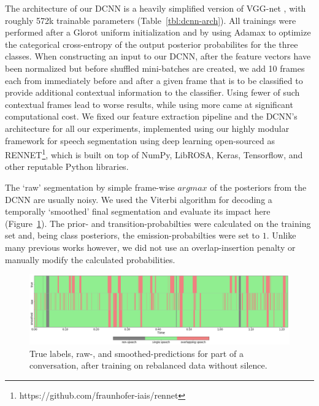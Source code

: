 \documentclass[a4paper]{article}
\begin{document}
The architecture of our DCNN is a heavily simplified version of VGG-net \cite{simonyan_very_2014},
with roughly 572k trainable parameters (Table~\ref{tbl:dcnn-arch}).
All trainings were performed after a Glorot uniform initialization and by using Adamax to optimize the categorical cross-entropy of the output posterior probabilites for the three classes.
When constructing an input to our DCNN,
after the feature vectors have been normalized but before shuffled mini-batches are created,
we add 10 frames each from immediately before and after a given frame that is to be classified
to provide additional contextual information to the classifier.
Using fewer of such contextual frames lead to worse results,
while using more came at significant computational cost.
We fixed our feature extraction pipeline and the DCNN's architecture for all our experiments,
implemented using our highly modular framework for
speech segmentation using deep learning open-sourced as
{RENNET}\footnote{https://github.com/fraunhofer-iais/rennet},
which is built on top of NumPy, LibROSA, Keras, Tensorflow, and other reputable Python libraries.

The `raw' segmentation by simple frame-wise $argmax$ of the posteriors from the DCNN are usually noisy.
We used the Viterbi algorithm \cite{rabiner_tutorial_1989} for decoding a temporally `smoothed' final segmentation and evaluate its impact here (Figure~\ref{fig:raw-smth-preds}).
The prior- and transition-probabilties were calculated on the training set and,
being class posteriors, the emission-probabilties were set to $1$.
Unlike many previous works \cite{zelenak_simultaneous_2012,zelenak_speaker_2012,GeigerUsinglinguisticinformation2013,yella_overlapping_2014,geiger_detecting_2013} however,
we did not use an overlap-insertion penalty or manually modify the calculated probabilities.

\begin{figure}[t]
  \centering
  \includegraphics[width=1.0\linewidth]{figures/raw-smth-preds.png}
  \caption{True labels, raw-, and smoothed-predictions for part of a conversation, after training on rebalanced data without silence.}
  \label{fig:raw-smth-preds}
  \vspace*{-\baselineskip}
\end{figure}
\end{document}
